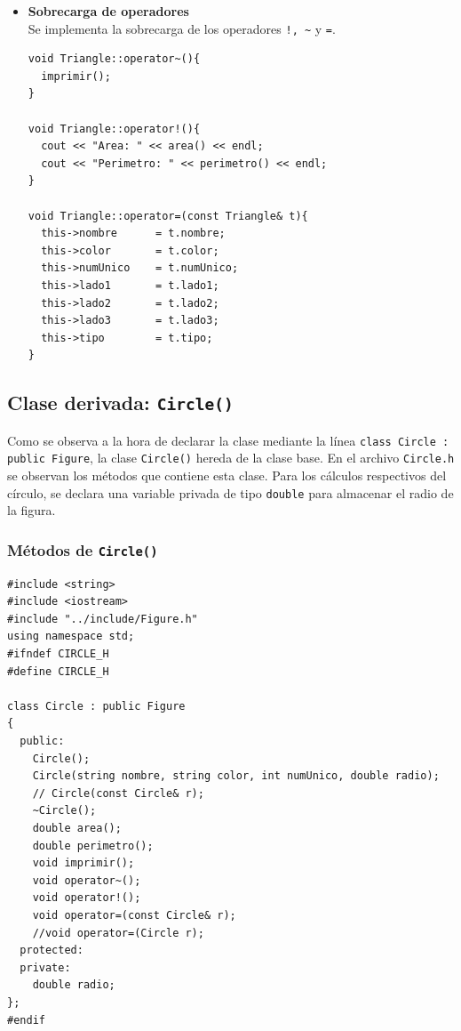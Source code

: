 \begin{itemize}
\item \textbf{Sobrecarga de operadores}\\
Se implementa la sobrecarga de los operadores \texttt{!, \~} y \texttt{=}.

\begin{verbatim}
void Triangle::operator~(){
  imprimir();
}

void Triangle::operator!(){
  cout << "Area: " << area() << endl;
  cout << "Perimetro: " << perimetro() << endl;
}

void Triangle::operator=(const Triangle& t){
  this->nombre		= t.nombre;
  this->color		= t.color;
  this->numUnico	= t.numUnico;
  this->lado1		= t.lado1;
  this->lado2		= t.lado2;
  this->lado3		= t.lado3;
  this->tipo		= t.tipo;
}
\end{verbatim}

\end{itemize}

\subsection{Clase derivada: \texttt{Circle()}}
Como se observa a la hora de declarar la clase mediante la línea \texttt{class Circle : public Figure}, la clase \texttt{Circle()} hereda de la clase base. En el archivo \texttt{Circle.h} se observan los métodos que contiene esta clase. Para los cálculos respectivos del círculo, se declara una variable privada de tipo \texttt{double} para almacenar el radio de la figura.

\subsubsection{Métodos de \texttt{Circle()}}
\begin{verbatim}
#include <string>
#include <iostream>
#include "../include/Figure.h"
using namespace std;
#ifndef CIRCLE_H
#define CIRCLE_H

class Circle : public Figure
{
  public:
    Circle();
    Circle(string nombre, string color, int numUnico, double radio);
    // Circle(const Circle& r);
    ~Circle();
    double area();
    double perimetro();
    void imprimir();
    void operator~();
    void operator!();
    void operator=(const Circle& r);
    //void operator=(Circle r);
  protected:
  private:
    double radio;
};
#endif
\end{verbatim}

